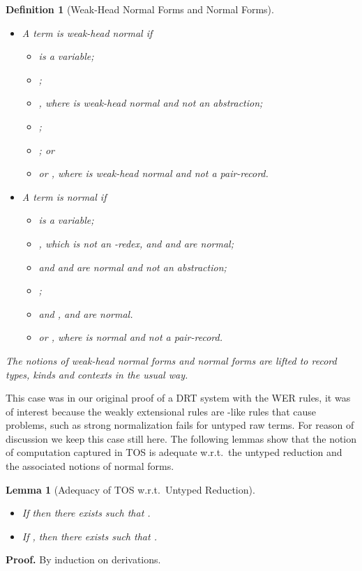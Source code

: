 \documentclass[submission,copyright,creativecommons]{eptcs}
\newtheorem{defn}[definition]{Definition}
\newtheorem{lemma}[definition]{Lemma}
\newcommand{\wrt}{{w.r.t.}}
\begin{document}
\begin{defn}[Weak-Head Normal Forms and Normal Forms] \label{WHN-N}\
\begin{itemize}
  \item A term  is \emph{weak-head normal} if
  \begin{itemize}
    \item  is a variable;
    \item ;
    \item , where  is weak-head normal and not an abstraction;
    \item ;
    \item ; or
    \item  or , where  is weak-head normal and not a pair-record.
  \end{itemize}

  \item A term  is \emph{normal} if
  \begin{itemize}
    \item  is a variable;
    \item , which is not an -redex, and  and  are normal;
    \item  and  and  are normal and  not an abstraction;
    \item ;
    \item  and ,  and  are normal.
    \item  or , where  is normal and not a pair-record.
  \end{itemize}
\end{itemize}
The notions of weak-head normal forms and normal forms are lifted to record types, kinds and contexts in the usual way.
\end{defn}


This case was in our original proof of a DRT system with the WER rules, it was of interest because the weakly extensional rules are -like rules that cause problems, such as strong normalization fails for untyped raw terms. For reason of discussion we keep this case still here.
The following lemmas show that the notion of computation captured in TOS is adequate \wrt\ the untyped reduction and the associated notions of normal forms.

\begin{lemma}[Adequacy of TOS \wrt\ Untyped Reduction] \label{AUR}\
\begin{itemize}
  \item If  then there exists  such that .
  \item If , then there exists  such that .
\end{itemize}
\end{lemma}
\textbf{Proof.} By induction on derivations.
\end{document}
